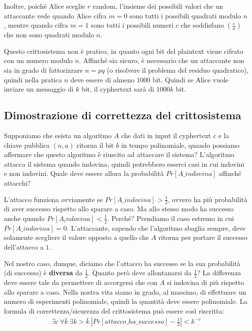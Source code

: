 \noindent Inoltre, poiché Alice sceglie $r$ random, l'insieme dei possibili valori che un attaccante vede quando Alice cifra $m = 0$ sono tutti i possibili quadrati modulo $n$, mentre quando cifra $m = 1$ sono tutti i possibili numeri $c$ che soddisfano $\left(\frac{c}{n} \right)$ che non sono quadrati modulo $n$.

Questo crittosistema non è pratico, in quanto ogni bit del plaintext viene cifrato con un numero modulo $n$. Affinché sia sicuro, è necessario che un attaccante non sia in grado di fattorizzare $n = pq$ (o risolvere il problema del residuo quadratico), quindi nella pratica $n$ deve essere di almeno $1000$ bit. Quindi se Alice vuole inviare un messaggio di $k$ bit, il cyphertext sarà di $1000k$ bit.

\subsection{Dimostrazione di correttezza del crittosistema}
Supponiamo che esista un algoritmo $A$ che dati in input il cyphertext $c$ e la chiave pubblica $(n, a)$ ritorna il bit $b$ in tempo polinomiale, quando possiamo affermare che questo algoritmo è riuscito ad attaccare il sistema? L'algoritmo attacca il sistema quando indovina, quindi potrebbero esserci casi in cui indovini e non indovini. Quale deve essere allora la probabilità $Pr[A\_indovina]$ affinché attacchi?

L'attacco funziona ovviamente se $Pr[A\_indovina] > \frac{1}{2}$, ovvero ha più probabilità di aver successo rispetto allo sparare a caso. Ma allo stesso modo ha successo anche quando $Pr[A_indovina] < \frac{1}{2}$. Perché? Prendiamo il caso estremo in cui $Pr[A\_indovina] = 0$. L'attaccante, sapendo che l'algoritmo sbaglia sempre, deve solamente scegliere il valore opposto a quello che $A$ ritorna per portare il successo dell'attacco a $1$.

Nel nostro caso, dunque, diciamo che l'attacco ha successo se la sua probabilità (di successo) è \textbf{diversa} da $\frac{1}{2}$. Quanto però deve allontanarsi da $\frac{1}{2}$? La differenza deve essere tale da permettere di accorgersi che con $A$ si indovina di più rispetto allo sparare a caso. Nella nostra vita siamo in grado, al massimo, di effettuare un numero di esperimenti polinomiale, quindi la quantità deve essere polinomiale. 
La formula di correttezza/sicurezza del crittosistema può essere così riscritta:
\begin{align*}
    \exists c \ \forall \bar{k} \ \exists k > \bar{k} \ \left|Pr[attacco\_ha\_successo] - \frac{1}{2}\right| < k^{-c}
\end{align*}

